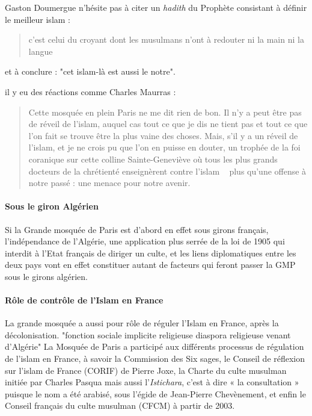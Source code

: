 Gaston Doumergue n'hésite pas à citer un \emph{hadith} du Prophète consistant à définir le meilleur islam : 
\begin{quote}
    c'est celui du croyant dont les musulmans n'ont à redouter ni la main ni la langue
\end{quote}
et à conclure : "cet islam-là est aussi le notre".


il y eu des réactions comme Charles Maurras : 
\begin{quote}
    Cette mosquée en plein Paris ne me dit rien de
bon. Il n'y a peut être pas de réveil de l'islam, auquel cas tout ce
que je dis ne tient pas et tout ce que l'on fait se trouve être la plus vaine des choses. Mais, s'il y a un réveil de l'islam, et je ne
crois pu que l'on en puisse en douter, un trophée de la foi coranique sur cette colline Sainte-Geneviève où tous les plus grands docteurs
de la chrétienté enseignèrent contre l'islam ~ plus
qu'une offense à notre passé : une menace pour notre avenir. 
\end{quote}

\paragraph{Sous le giron Algérien}
Si la Grande mosquée de Paris est d'abord en effet sous girons français, l'indépendance de l'Algérie, une application plus serrée de la loi de 1905 qui interdit à l'Etat français de diriger un culte, et les liens diplomatiques entre les deux pays vont en effet constituer autant de facteurs qui feront passer la GMP sous le girons algérien. 

\paragraph{Rôle de contrôle de l'Islam en France} La grande mosquée a aussi pour rôle de réguler l'Islam en France, après la décolonisation. "fonction sociale implicite religieuse diaspora religieuse venant d'Algérie" 
La Mosquée de Paris a participé aux différents
processus de régulation de l’islam en France, à
savoir la Commission des Six sages, le Conseil
de réflexion sur l’islam de France (CORIF) de
Pierre Joxe, la Charte du culte musulman initiée
par Charles Pasqua mais aussi l’\emph{Istichara}, c’est à
dire « la consultation » puisque le nom a été
arabisé, sous l’égide de Jean-Pierre
Chevènement, et enfin le Conseil français du
culte musulman (CFCM) à partir de 2003.

